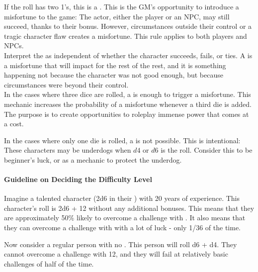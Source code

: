 \documentclass{LegrandOrangeTufteBook}
\begin{document}
If the roll has two 1's, this is a .
This is the GM's opportunity to introduce a misfortune to the game:
The actor, either the player or an NPC, may still succeed, thanks to their bonus.
However, circumstances outside their control or a tragic character flaw creates a misfortune.
This rule applies to both players and NPCs. \\

Interpret the  as independent of whether the character
succeeds, fails, or ties. A  is a misfortune that will
impact for the rest of the rest, and it is something happening not
because the character was not good enough, but because circumstances were
beyond their control.\\


In the cases where three dice are rolled,
a  is enough to trigger a misfortune.
This mechanic increases the probability of a misfortune
whenever a third die is added. The purpose is to create
opportunities to roleplay immense power that comes at a
cost.\\

In the cases where only one die is rolled,
a  is not possible. This is intentional:
These characters may be underdogs when $d4$ or $d6$ is the roll.
Consider this to be beginner's luck, or as a mechanic to protect the
underdog.\\

\paragraph*{Guideline on Deciding the Difficulty Level}

Imagine a talented character (2d6 in their ) with 20 years of experience.
This character's roll is 2d6 + 12 without any additional bonuses.
This means that they are approximately 50\% likely to overcome a challenge with .
It also means that they can overcome a challenge with  with a lot of luck - only 1/36 of the time.\\

\marginpar{
	\footnotesize
	
}

Now consider a regular person with no . This person will roll d6 + d4.
They cannot overcome a challenge with 12,
and they will fail at relatively basic challenges of  half of the time.\\
\end{document}
